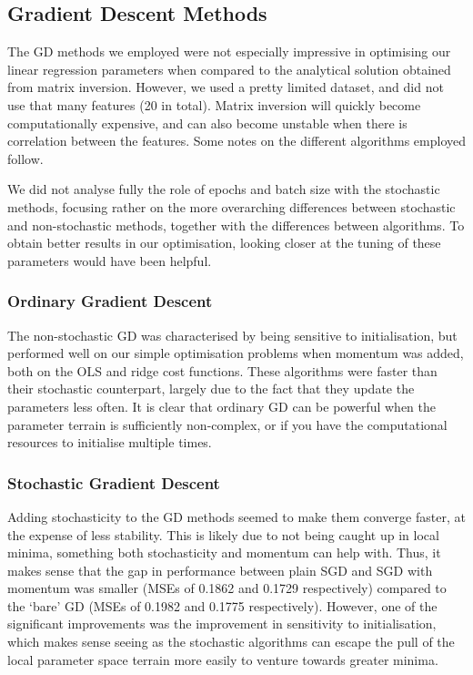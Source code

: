 \subsection{Gradient Descent Methods}
    The GD methods we employed were not especially impressive in optimising our linear regression parameters when compared to the analytical solution obtained from matrix inversion. However, we used a pretty limited dataset, and did not use that many features (20 in total). Matrix inversion will quickly become computationally expensive, and can also become unstable when there is correlation between the features. Some notes on the different algorithms employed follow.

    We did not analyse fully the role of epochs and batch size with the stochastic methods, focusing rather on the more overarching differences between stochastic and non-stochastic methods, together with the differences between algorithms. To obtain better results in our optimisation, looking closer at the tuning of these parameters would have been helpful.

    \subsubsection{Ordinary Gradient Descent}
        The non-stochastic GD was characterised by being sensitive to initialisation, but performed well on our simple optimisation problems when momentum was added, both on the OLS and ridge cost functions. These algorithms were faster than their stochastic counterpart, largely due to the fact that they update the parameters less often. It is clear that ordinary GD can be powerful when the parameter terrain is sufficiently non-complex, or if you have the computational resources to initialise multiple times. 

    \subsubsection{Stochastic Gradient Descent}
        Adding stochasticity to the GD methods seemed to make them converge faster, at the expense of less stability. This is likely due to not being caught up in local minima, something both stochasticity and momentum can help with. Thus, it makes sense that the gap in performance between plain SGD and SGD with momentum was smaller (MSEs of 0.1862 and 0.1729 respectively) compared to the `bare' GD (MSEs of 0.1982 and 0.1775 respectively). However, one of the significant improvements was the improvement in sensitivity to initialisation, which makes sense seeing as the stochastic algorithms can escape the pull of the local parameter space terrain more easily to venture towards greater minima.

